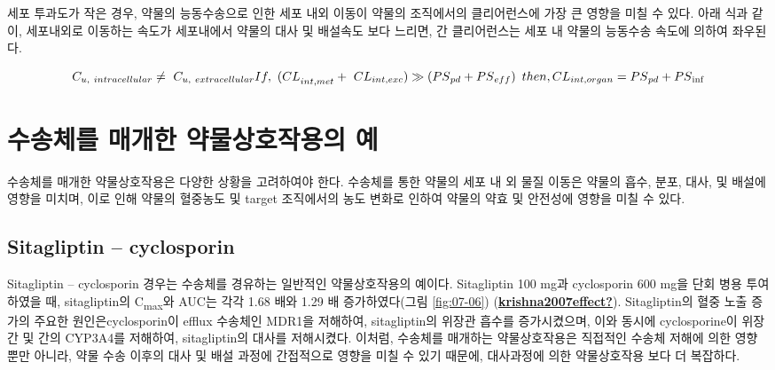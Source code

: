 \documentclass[
  11pt,
  krantz2, a4paper, twoside]{krantz}
\begin{document}
세포 투과도가 작은 경우, 약물의 능동수송으로 인한 세포 내외 이동이
약물의 조직에서의 클리어런스에 가장 큰 영향을 미칠 수 있다. 아래 식과
같이, 세포내외로 이동하는 속도가 세포내에서 약물의 대사 및 배설속도
보다 느리면, 간 클리어런스는 세포 내 약물의 능동수송 속도에 의하여
좌우된다.

\[
C_{u,\ intracellular} \neq \ C_{u,\ extracellular} \\
{If,\ (CL}_{int,met} + \ {CL}_{int,exc}) \gg \left( {PS}_{pd} + {PS}_{eff} \right)\ then, \\
{CL}_{int,organ} = {PS}_{pd} + {PS}_{\inf}
\]

\hypertarget{uxc218uxc1a1uxccb4uxb97c-uxb9e4uxac1cuxd55c-uxc57duxbb3cuxc0c1uxd638uxc791uxc6a9uxc758-uxc608}{%
\section{수송체를 매개한 약물상호작용의 예}\label{uxc218uxc1a1uxccb4uxb97c-uxb9e4uxac1cuxd55c-uxc57duxbb3cuxc0c1uxd638uxc791uxc6a9uxc758-uxc608}}

수송체를 매개한 약물상호작용은 다양한 상황을 고려하여야 한다. 수송체를
통한 약물의 세포 내 외 물질 이동은 약물의 흡수, 분포, 대사, 및 배설에
영향을 미치며, 이로 인해 약물의 혈중농도 및 target 조직에서의 농도
변화로 인하여 약물의 약효 및 안전성에 영향을 미칠 수 있다.

\hypertarget{sitagliptin-cyclosporin}{%
\subsection{Sitagliptin -- cyclosporin}\label{sitagliptin-cyclosporin}}

Sitagliptin -- cyclosporin 경우는 수송체를 경유하는 일반적인
약물상호작용의 예이다. Sitagliptin 100 mg과 cyclosporin 600 mg을 단회
병용 투여하였을 때, sitagliptin의 C\textsubscript{max}와 AUC는 각각 1.68 배와 1.29 배
증가하였다(그림 \ref{fig:07-06}) (\protect\hyperlink{ref-krishna2007effect}{\textbf{krishna2007effect?}}). Sitagliptin의 혈중 노출
증가의 주요한 원인은cyclosporin이 efflux 수송체인 MDR1을 저해하여,
sitagliptin의 위장관 흡수를 증가시켰으며, 이와 동시에 cyclosporine이
위장간 및 간의 CYP3A4를 저해하여, sitagliptin의 대사를 저해시켰다.
이처럼, 수송체를 매개하는 약물상호작용은 직접적인 수송체 저해에 의한
영향 뿐만 아니라, 약물 수송 이후의 대사 및 배설 과정에 간접적으로 영향을
미칠 수 있기 때문에, 대사과정에 의한 약물상호작용 보다 더 복잡하다.
\end{document}
